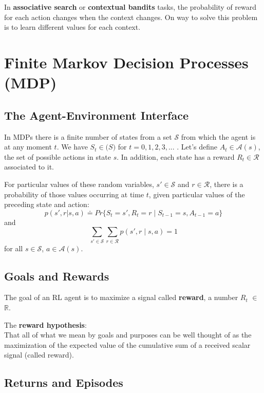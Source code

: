 \documentclass[11pt]{article}
\begin{document}
In \textbf{associative search} or \textbf{contextual bandits} tasks, the probability of reward
for each action changes when the context changes. On way to solve this problem
is to learn different values for each context.

\section{Finite Markov Decision Processes (MDP)}
\label{sec:org11427c3}
\subsection{The Agent-Environment Interface}
\label{sec:org2d8f529}

In MDPs there is a finite number of states from a set \(\mathcal{S}\) from which
the agent is at any moment \(t\). We have \(S_{t} \in \mathcal(S)\) for
\(t=0,1,2,3,{...}\) . Let's define \(A_{t} \in \mathcal{A}(s)\), the set of possible
actions in state \(s\). In addition, each
state has a reward \(R_{t} \in \mathcal{R}\) associated to it.

For particular values of these random variables, \(s' \in \mathcal{S}\) and \(r \in
\mathcal{R}\), there is a probability of those values occurring at time \(t\),
given particular values of the preceding state and action:
\begin{equation}
p(s',r|s,a) \doteq Pr\{S_{t}=s', R_{t}=r \mid S_{t-1}=s, A_{t-1}=a \}
\end{equation}
and
\begin{equation}
\sum\limits_{s' \in \mathcal{S}} \sum\limits_{r \in \mathcal{R}}
p(s',r \mid s,a) = 1
\end{equation}
for all \(s \in \mathcal{S}\), \(a \in \mathcal{A}(s)\).

\subsection{Goals and Rewards}
\label{sec:orgb2ae2eb}

The goal of an RL agent is to maximize a signal called \textbf{reward}, a number \(R_t\)
\(\in\) \(\mathbb{R}\).

The \textbf{reward hypothesis}:\\
That all of what we mean by goals and purposes can be well thought of as the
maximization of the expected value of the cumulative sum of a received scalar
signal (called reward).

\subsection{Returns and Episodes}
\label{sec:org5cfa180}
\end{document}
